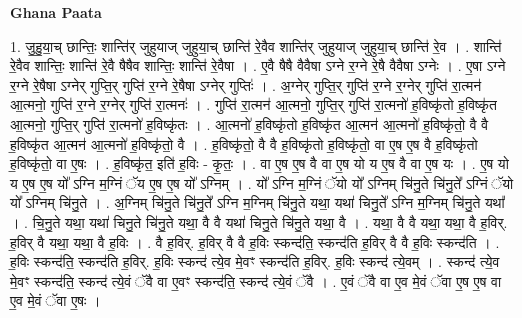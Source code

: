 \documentclass[17pt]{extarticle}
\begin{document}
\textbf{Ghana Paata } \newline

1. जु॒हु॒या॒च् छान्तिः॒ शान्ति॑र् जुहुयाज् जुहुया॒च् छान्ति॑ रे॒वैव शान्ति॑र् जुहुयाज् जुहुया॒च् छान्ति॑ रे॒व । . शान्ति॑ रे॒वैव शान्तिः॒ शान्ति॑ रे॒वै षैषैव शान्तिः॒ शान्ति॑ रे॒वैषा । . ए॒वै षैषै वैवैषा ऽग्ने र॒ग्ने रे॒षै वैवैषा ऽग्नेः । . ए॒षा ऽग्ने र॒ग्ने रे॒षैषा ऽग्नेर् गुप्ति॒र् गुप्ति॑ र॒ग्ने रे॒षैषा ऽग्नेर् गुप्तिः॑ । . अ॒ग्नेर् गुप्ति॒र् गुप्ति॑ र॒ग्ने र॒ग्नेर् गुप्ति॑ रा॒त्मन॑ आ॒त्मनो॒ गुप्ति॑ र॒ग्ने र॒ग्नेर् गुप्ति॑ रा॒त्मनः॑ । . गुप्ति॑ रा॒त्मन॑ आ॒त्मनो॒ गुप्ति॒र् गुप्ति॑ रा॒त्मनो॑ ह॒विष्कृ॑तो ह॒विष्कृ॑त आ॒त्मनो॒ गुप्ति॒र् गुप्ति॑ रा॒त्मनो॑ ह॒विष्कृ॑तः । . आ॒त्मनो॑ ह॒विष्कृ॑तो ह॒विष्कृ॑त आ॒त्मन॑ आ॒त्मनो॑ ह॒विष्कृ॑तो॒ वै वै ह॒विष्कृ॑त आ॒त्मन॑ आ॒त्मनो॑ ह॒विष्कृ॑तो॒ वै । . ह॒विष्कृ॑तो॒ वै वै ह॒विष्कृ॑तो ह॒विष्कृ॑तो॒ वा ए॒ष ए॒ष वै ह॒विष्कृ॑तो ह॒विष्कृ॑तो॒ वा ए॒षः । . ह॒विष्कृ॑त॒ इति॑ ह॒विः - कृ॒तः॒ । . वा ए॒ष ए॒ष वै वा ए॒ष यो य ए॒ष वै वा ए॒ष यः । . ए॒ष यो य ए॒ष ए॒ष यो᳚ ऽग्नि म॒ग्निं ॅय ए॒ष ए॒ष यो᳚ ऽग्निम् । . यो᳚ ऽग्नि म॒ग्निं ॅयो यो᳚ ऽग्निम् चि॑नु॒ते चि॑नु॒ते᳚ ऽग्निं ॅयो यो᳚ ऽग्निम् चि॑नु॒ते । . अ॒ग्निम् चि॑नु॒ते चि॑नु॒ते᳚ ऽग्नि म॒ग्निम् चि॑नु॒ते यथा॒ यथा॑ चिनु॒ते᳚ ऽग्नि म॒ग्निम् चि॑नु॒ते यथा᳚ । . चि॒नु॒ते यथा॒ यथा॑ चिनु॒ते चि॑नु॒ते यथा॒ वै वै यथा॑ चिनु॒ते चि॑नु॒ते यथा॒ वै । . यथा॒ वै वै यथा॒ यथा॒ वै ह॒विर्. ह॒विर् वै यथा॒ यथा॒ वै ह॒विः । . वै ह॒विर्. ह॒विर् वै वै ह॒विः स्कन्द॑ति॒ स्कन्द॑ति ह॒विर् वै वै ह॒विः स्कन्द॑ति । . ह॒विः स्कन्द॑ति॒ स्कन्द॑ति ह॒विर्. ह॒विः स्कन्द॑ त्ये॒व मे॒वꣳ स्कन्द॑ति ह॒विर्. ह॒विः स्कन्द॑ त्ये॒वम् । . स्कन्द॑ त्ये॒व मे॒वꣳ स्कन्द॑ति॒ स्कन्द॑ त्ये॒वं ॅवै वा ए॒वꣳ स्कन्द॑ति॒ स्कन्द॑ त्ये॒वं ॅवै । . ए॒वं ॅवै वा ए॒व मे॒वं ॅवा ए॒ष ए॒ष वा ए॒व मे॒वं ॅवा ए॒षः । \newline
\end{document}
